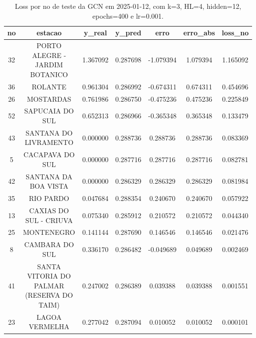 \begin{table}[h]
\centering
\caption{Loss por no de teste da GCN em 2025-01-12, com k=3, HL=4, hidden=12, epochs=400 e lr=0.001.}
\label{tab:gcn_loss_k3_hl4_h12_e400_d20250112}
\begin{tabular}{ccccccc}
\toprule
no & estacao & y\_real & y\_pred & erro & erro\_abs & loss\_no \\
\midrule
32 & PORTO ALEGRE - JARDIM BOTANICO & 1.367092 & 0.287698 & -1.079394 & 1.079394 & 1.165092 \\
36 & ROLANTE & 0.961304 & 0.286992 & -0.674311 & 0.674311 & 0.454696 \\
26 & MOSTARDAS & 0.761986 & 0.286750 & -0.475236 & 0.475236 & 0.225849 \\
52 & SAPUCAIA DO SUL & 0.652313 & 0.286966 & -0.365348 & 0.365348 & 0.133479 \\
43 & SANTANA DO LIVRAMENTO & 0.000000 & 0.288736 & 0.288736 & 0.288736 & 0.083369 \\
5 & CACAPAVA DO SUL & 0.000000 & 0.287716 & 0.287716 & 0.287716 & 0.082781 \\
42 & SANTANA DA BOA VISTA & 0.000000 & 0.286329 & 0.286329 & 0.286329 & 0.081984 \\
35 & RIO PARDO & 0.047684 & 0.288354 & 0.240670 & 0.240670 & 0.057922 \\
13 & CAXIAS DO SUL - CRIUVA & 0.075340 & 0.285912 & 0.210572 & 0.210572 & 0.044340 \\
25 & MONTENEGRO & 0.141144 & 0.287690 & 0.146546 & 0.146546 & 0.021476 \\
8 & CAMBARA DO SUL & 0.336170 & 0.286482 & -0.049689 & 0.049689 & 0.002469 \\
41 & SANTA VITORIA DO PALMAR (RESERVA DO TAIM) & 0.247002 & 0.286389 & 0.039388 & 0.039388 & 0.001551 \\
23 & LAGOA VERMELHA & 0.277042 & 0.287094 & 0.010052 & 0.010052 & 0.000101 \\
\bottomrule
\end{tabular}
\end{table}

